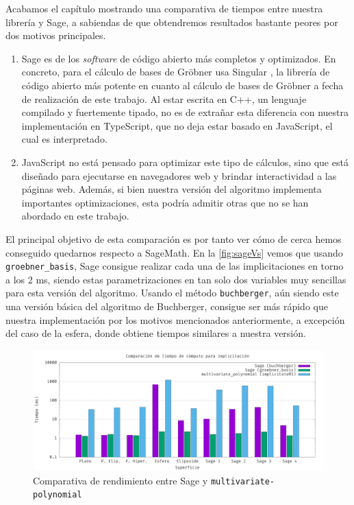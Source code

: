 Acabamos el capítulo mostrando una comparativa de tiempos entre nuestra librería y Sage, a sabiendas de que obtendremos resultados bastante peores por dos motivos principales.
\begin{enumerate}
    \item Sage es de los \textit{software} de código abierto más completos y optimizados. En concreto, para el cálculo de bases de Gröbner usa Singular \cite{singular}, la librería de código abierto más potente en cuanto al cálculo de bases de Gröbner a fecha de realización de este trabajo. Al estar escrita en C++, un lenguaje compilado y fuertemente tipado, no es de extrañar esta diferencia con nuestra implementación en TypeScript, que no deja estar basado en JavaScript, el cual es interpretado. 
    \item JavaScript no está pensado para optimizar este tipo de cálculos, sino que está diseñado para ejecutarse en navegadores web y brindar interactividad a las páginas web. Además, si bien nuestra versión del algoritmo implementa importantes optimizaciones, esta podría admitir otras que no se han abordado en este trabajo.
\end{enumerate}
El principal objetivo de esta comparación es por tanto ver cómo de cerca hemos conseguido quedarnos respecto a SageMath. En la \autoref{fig:sageVs} vemos que usando \texttt{groebner\_basis}, Sage consigue realizar cada una de las implicitaciones en torno a los 2 ms, siendo estas parametrizaciones en tan solo dos variables muy sencillas para esta versión del algoritmo. Usando  el método \texttt{buchberger}, aún siendo este una versión básica del algoritmo de Buchberger, consigue ser más rápido que nuestra implementación por los motivos mencionados anteriormente, a excepción del caso de la esfera, donde obtiene tiempos similares a nuestra versión.
\begin{figure}[!ht]
    \centering
    \includegraphics[width=\textwidth]{Plantilla-TFG-master/img/graficas/TiemposImp.png}
    \caption{Comparativa de rendimiento entre Sage y \texttt{multivariate-polynomial}}
    \label{fig:sageVs}
\end{figure}
